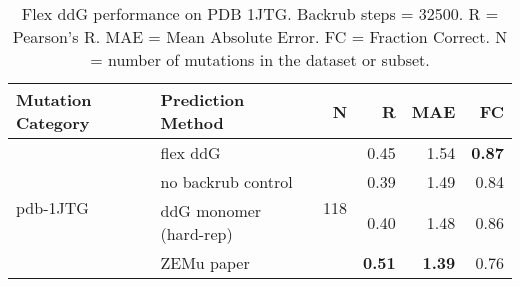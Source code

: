 \begin{table}
  \begin{tabular}{llrrrr}
\toprule
Mutation Category &       Prediction Method &    N &    R &  MAE &   FC \\
\midrule
 \multirow{ 4}{*}{pdb-1JTG} & flex ddG & \multirow{ 4}{*}{118} & 0.45 & 1.54 & \textbf{0.87}  \\
 & no backrub control & & 0.39 & 1.49 & 0.84  \\
 & ddG monomer (hard-rep) & & 0.40 & 1.48 & 0.86  \\
 & ZEMu paper & & \textbf{0.51} & \textbf{1.39} & 0.76  \\
\bottomrule
\end{tabular}
  \caption[Flex ddG performance on PDB 1JTG]{
    Flex ddG performance on PDB 1JTG. Backrub steps = 32500. R = Pearson's R. MAE = Mean Absolute Error. FC = Fraction Correct. N = number of mutations in the dataset or subset.
  } \label{tab:table-pdb-1JTG}
\end{table}
